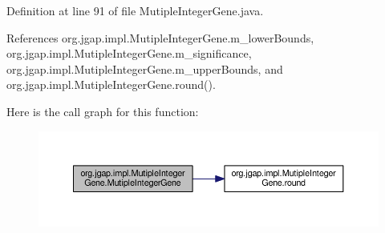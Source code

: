 Definition at line 91 of file Mutiple\-Integer\-Gene.\-java.



References org.\-jgap.\-impl.\-Mutiple\-Integer\-Gene.\-m\-\_\-lower\-Bounds, org.\-jgap.\-impl.\-Mutiple\-Integer\-Gene.\-m\-\_\-significance, org.\-jgap.\-impl.\-Mutiple\-Integer\-Gene.\-m\-\_\-upper\-Bounds, and org.\-jgap.\-impl.\-Mutiple\-Integer\-Gene.\-round().



Here is the call graph for this function\-:
\nopagebreak
\begin{figure}[H]
\begin{center}
\leavevmode
\includegraphics[width=350pt]{classorg_1_1jgap_1_1impl_1_1_mutiple_integer_gene_aeb94893f820a2e9a40e3b6f5d511ebbb_cgraph}
\end{center}
\end{figure}




